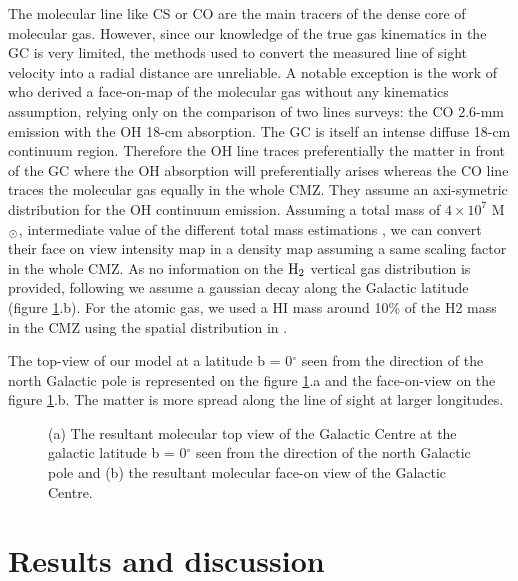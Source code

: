 \documentclass[a4paper,fleqn,usenatbib]{mnras}
\begin{document}
The molecular line like CS or CO are the main tracers of the dense core of molecular gas. However, since our knowledge of the true gas kinematics in the GC is very limited, the methods used to convert the measured line of sight velocity into a radial distance are unreliable. A notable exception is the work of \citet{2004MNRAS.349.1167S} who derived a face-on-map of the molecular gas without any kinematics assumption, relying only on the comparison of two lines surveys: the CO 2.6-mm emission with the OH 18-cm absorption. The GC is itself an intense diffuse 18-cm continuum region. Therefore the OH line traces preferentially the matter in front of the GC where the OH absorption will preferentially arises whereas the CO line traces the molecular gas equally in the whole CMZ. They assume an axi-symetric distribution for the OH continuum emission. Assuming a total mass of $4\times 10^7$ M$\rm_{\odot}$, intermediate value of the different total mass estimations \citep{1998A&A...331..959D, 2005ApJ...632..882O, 1995PASJ...47..527S}, we can convert their face on view intensity map in a density map assuming a same scaling factor in the whole CMZ. As no information on the $\rm H_2$ vertical gas distribution is provided, following \citet{2007A&A...467..611F} we assume a gaussian decay along the Galactic latitude (figure \ref{sawada}.b). For the atomic gas, we used a HI mass around 10\% of the H2 mass in the CMZ using the spatial distribution in \citet{2007A&A...467..611F}. 

The top-view of our model at a latitude b = 0$^\circ$ seen from the direction of the north Galactic pole is represented on the figure \ref{sawada}.a and the face-on-view on the figure \ref{sawada}.b. The matter is more spread along the line of sight at larger longitudes.

\begin{figure}
\centering
{}
\caption{(a) The resultant molecular top view of the Galactic Centre at the galactic latitude b = 0$^\circ$ seen from the direction of the north Galactic pole and (b) the resultant molecular face-on view of the Galactic Centre.}
\label{sawada}
\end{figure}

%
%
%
\section{Results and discussion}
\label{results}
\end{document}
